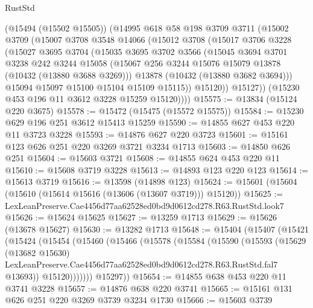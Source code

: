 \begin{lexlean}{RustStd}
\begin{coremodule}
        (@15494 (@15502 @15505))
        (@14995
          @618
          @58
          @198
          @3709
          @3711
          (@15002
            @3709
            (@15007
              @3708
              @3548
              @14066
              (@15012
                @3708
                (@15017
                  @3706
                  @3228
                  (@15027
                    @3695
                    @3704
                    (@15035
                      @3695
                      @3702
                      @3566
                      (@15045
                        @3694
                        @3701
                        @3238
                        @242
                        @3244
                        @15058
                        (@15067 @256 @3244 @15076 @15079 @13878 (@10432 (@13880 @3688 @3269)))
                        @13878
                        (@10432 (@13880 @3682 @3694)))
                      @15094
                      @15097
                      @15100
                      @15104
                      @15109
                      @15115))
                  @15120))
              @15127))
          (@15230 @453 @196 @11 @3612 @3228 @15259 @15120))))
@15575 := @13834 (@15124 @220 @3675)
@15578 := @15472 (@15475 (@15572 @15575))
@15584 := @15230 @629 @196 @251 @3612 @15413 @15259
@15590 := @14855 @627 @453 @220 @11 @3723 @3228
@15593 := @14876 @627 @220 @3723
@15601 := @15161 @123 @626 @251 @220 @3269 @3721 @3234 @1713
@15603 := @14850 @626 @251
@15604 := @15603 @3721
@15608 := @14855 @624 @453 @220 @11
@15610 := @15608 @3719 @3228
@15613 := @14893 @123 @220 @123
@15614 := @15613 @3719
@15616 := @13598 (@14898 @123)
@15624 := @15601 (@15604 (@15610 (@15614 @15616 (@13606 (@13607 @3719))) @15120))
@15625 := LexLeanPreserve.Cae4456d77aa62528ed0bd9d0612cd278.R63.RustStd.look7
@15626 := @15624 @15625
@15627 := @13259 @1713
@15629 := @15626 (@13678 @15627)
@15630 := @13282 @1713
@15648 := @15404
    (@15407
      (@15421
        (@15424
          (@15454
            (@15460
              (@15466
                (@15578
                  (@15584
                    (@15590
                      (@15593
                        (@15629
                          (@13682 @15630)
                          LexLeanPreserve.Cae4456d77aa62528ed0bd9d0612cd278.R63.RustStd.fal7
                          @13693))
                      @15120)))))))
        @15297))
@15654 := @14855 @638 @453 @220 @11 @3741 @3228
@15657 := @14876 @638 @220 @3741
@15665 := @15161 @131 @626 @251 @220 @3269 @3739 @3234 @1730
@15666 := @15603 @3739

\end{coremodule}
\end{lexlean}
